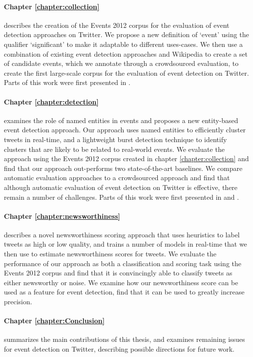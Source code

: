 \paragraph{Chapter \ref{chapter:collection}} describes the creation of the Events 2012 corpus for the evaluation of event detection approaches on Twitter. We propose a new definition of `event' using the qualifier `significant' to make it adaptable to different uses-cases.
We then use a combination of existing event detection approaches and Wikipedia to create a set of candidate events, which we annotate through a crowdsourced evaluation, to create the first large-scale corpus for the evaluation of event detection on Twitter. Parts of this work were first presented in \cite{McMinn2013}.

\paragraph{Chapter \ref{chapter:detection}} examines the role of named entities in events and proposes a new entity-based event detection approach.
Our approach uses named entities to efficiently cluster tweets in real-time, and a lightweight burst detection technique to identify clusters that are likely to be related to real-world events.
We evaluate the approach using the Events 2012 corpus created in chapter \ref{chapter:collection} and find that our approach out-performs two state-of-the-art baselines.
We compare automatic evaluation approaches to a crowdsourced approach and find that although automatic evaluation of event detection on Twitter is effective, there remain a number of challenges.
Parts of this work were first presented in \cite{McMinn14} and \cite{McMinn15}.

\paragraph{Chapter \ref{chapter:newsworthiness}} describes a novel newsworthiness scoring approach that uses heuristics to label tweets as high or low quality, and trains a number of models in real-time that we then use to estimate newsworthiness scores for tweets.
We evaluate the performance of our approach as both a classification and scoring task using the Events 2012 corpus and find that it is convincingly able to classify tweets as either newsworthy or noise.
We examine how our newsworthiness score can be used as a feature for event detection, find that it can be used to greatly increase precision.

\paragraph{Chapter \ref{chapter:Conclusion}} summarizes the main contributions of this thesis, and examines remaining issues for event detection on Twitter, describing possible directions for future work.


\newpage
